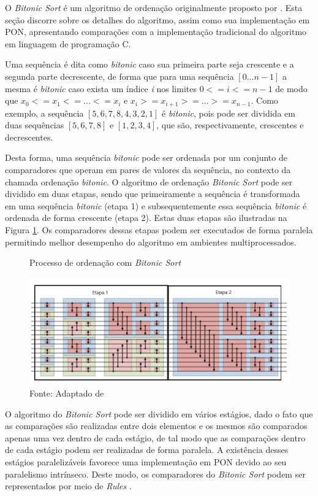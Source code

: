 O \textit{Bitonic Sort} é um algoritmo de ordenação originalmente proposto por
. Esta seção discorre sobre os detalhes do algoritmo,
assim como sua implementação em PON, apresentando comparações com a
implementação tradicional do algoritmo em linguagem de programação C.

Uma sequência é dita como \textit{bitonic} caso sua primeira parte seja
crescente e a segunda parte decrescente, de forma que para uma sequência \([0
... n-1]\) a mesma é \textit{bitonic} caso exista um índice \textit{i} nos
limites \(0<=i<=n-1\) de modo que \(x_0 <= x_1 <= ... <= x_i\) e \(x_i >=
x_{i+1} >= ... >= x_{n-1}\). Como exemplo, a sequência \([5, 6, 7, 8, 4, 3, 2,
1]\) é \textit{bitonic}, pois pode ser dividida em duas sequências \([5, 6, 7,
8]\) e \([1, 2, 3, 4]\), que são, respectivamente, crescentes e decrescentes.

Desta forma, uma sequência \textit{bitonic} pode ser ordenada por um conjunto de
comparadores que operam em pares de valores da sequência, no contexto da chamada
ordenação \textit{bitonic}. O algoritmo de ordenação \textit{Bitonic Sort} pode
ser dividido em duas etapas, sendo que primeiramente a sequência é transformada
em uma sequência \textit{bitonic} (etapa 1) e subsequentemente essa sequência
\textit{bitonic} é ordenada de forma crescente (etapa 2). Estas duas etapas são
ilustradas na Figura \ref{fig:bitonic_order}. Os comparadores dessas etapas
podem ser executados de forma paralela permitindo melhor desempenho do algoritmo
em ambientes multiprocessados.

\begin{figure}[!htb]
\centering
\caption{Processo de ordenação com \textit{Bitonic Sort}} \includegraphics[width=\textwidth]{../figures/bitonic_sort_mod.png}
\smallskip
\caption*{Fonte:
Adaptado de }
\label{fig:bitonic_order}
\end{figure}

O algoritmo do \textit{Bitonic Sort} pode ser dividido em vários estágios, dado
o fato que as comparações são realizadas entre dois elementos e os mesmos são
comparados apenas uma vez dentro de cada estágio, de tal modo que as comparações
dentro de cada estágio podem ser realizadas de forma paralela. A existência
desses estágios paralelizáveis favorece uma implementação em PON devido ao seu
paralelismo intrínseco. Deste modo, os comparadores do \textit{Bitonic Sort}
podem ser representados por meio de \textit{Rules}
\cite{quali_pordeus_2020,pordeus_2021}.

